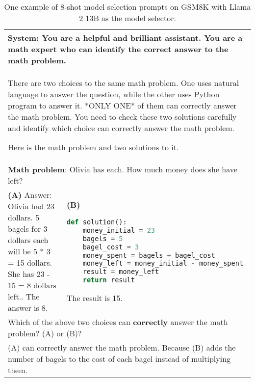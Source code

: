 \documentclass[11pt]{article}
\begin{document}
\begin{table*}[h]
    \centering
    \begin{tabular}{p{}|p{}}
    \toprule
     \multicolumn{2}{p{0.92\textwidth}}{\small 
     \textbf{System}: You are a helpful and brilliant assistant. You are a math expert who can identify the correct answer to the math problem.}\\
     \midrule
     \multicolumn{2}{p{0.92\textwidth}}{\small There are two choices to the same math problem. One uses natural language to answer the question, while the other uses Python program to answer it. *ONLY ONE* of them can correctly answer the math problem. 
You need to check these two solutions carefully and identify which choice can correctly answer the math problem. 

Here is the math problem and two solutions to it.} 
\\
      \multicolumn{2}{p{0.92\textwidth}}{\small \textbf{Math problem}: Olivia has \3 each. How much money does she have left?} \\
     
    \midrule

    \small \textbf{(A)}  \newline
    \newline
    \small Answer: \newline
     \small Olivia had 23 dollars. \newline
     \small 5 bagels for 3 dollars each will be 5 * 3 = 15 dollars. \newline
     \small She has 23 - 15 = 8 dollars left..\newline
     \small The answer is 8.\newline
     &
    \small \textbf{(B)} 
    \lstset{style=mystyle}
     \begin{lstlisting}[language=Python]
def solution():
    money_initial = 23
    bagels = 5
    bagel_cost = 3
    money_spent = bagels + bagel_cost
    money_left = money_initial - money_spent
    result = money_left
    return result
     \end{lstlisting} 
     The result is 15.
     \\

     \midrule
     \multicolumn{2}{p{0.92\textwidth}}{\small Which of the above two choices can \textbf{correctly} answer the math problem? (A) or (B)? }\\
     \midrule
      \multicolumn{2}{p{0.92\textwidth}}{\small (A) can correctly answer the math problem. Because (B) adds the number of bagels to the cost of each bagel instead of multiplying them.}\\
     \bottomrule
    \end{tabular}
    \caption{One example of 8-shot model selection prompts on GSM8K with Llama 2 13B as the model selector.}

    \label{tab:llama2_13b_example_math}
\end{table*}
\end{document}
